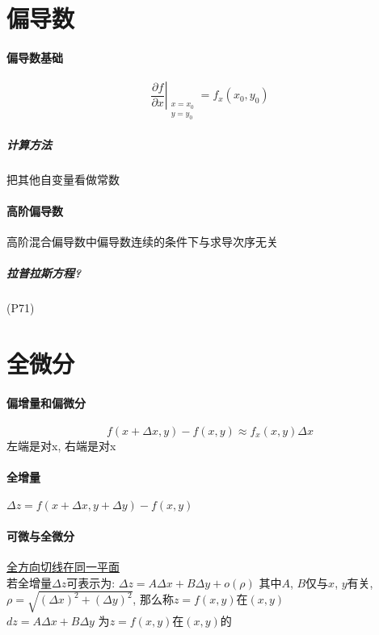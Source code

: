 \documentclass[main.tex]{subfiles}
\begin{document}
\section{偏导数}
\paragraph{偏导数基础}
\[ \left. \frac{\partial f}{\partial x} \right|_{\begin{smallmatrix}x = x_0\\y = y_0\end{smallmatrix}} = f_x(x_0, y_0) \]
\subparagraph{计算方法} 把其他自变量看做常数
\paragraph{高阶偏导数}
    高阶混合偏导数中偏导数连续的条件下与求导次序无关
\subparagraph{拉普拉斯方程?} (P71)

\section{全微分}
\paragraph{偏增量和偏微分}
\[ f(x + \Delta x, y) - f(x, y) \approx f_x(x, y) \Delta x \]
左端是对x, 右端是对x
\paragraph{全增量}
$\Delta z = f (x + \Delta x, y + \Delta y) - f(x, y)$
\paragraph{可微与全微分}
\underline{全方向切线在同一平面}\\
若全增量$\Delta z$可表示为: $\Delta z = A \Delta x + B \Delta y + o(\rho)$
其中$A$, $B$仅与$x$, $y$有关, $\rho = \sqrt{(\Delta x)^2 + (\Delta y)^2}$,
那么称$z = f(x, y)$在$(x, y)$\\
$dz = A \Delta x + B \Delta y$ 为$z = f(x, y)$在$(x, y)$的
\end{document}
